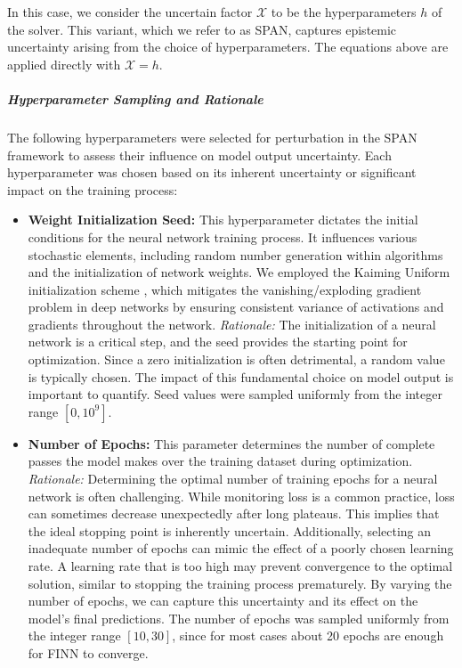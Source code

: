 In this case, we consider the uncertain factor $\mathcal{X}$ to be the hyperparameters $h$ of the solver. This variant, which we refer to as SPAN, captures epistemic uncertainty arising from the choice of hyperparameters. The equations above are applied directly with $\mathcal{X} = h$.

\subparagraph{Hyperparameter Sampling and Rationale}
The following hyperparameters were selected for perturbation in the SPAN framework to assess their influence on model output uncertainty. Each hyperparameter was chosen based on its inherent uncertainty or significant impact on the training process:

\begin{itemize}
    \item \textbf{Weight Initialization Seed:} This hyperparameter dictates the initial conditions for the neural network training process. It influences various stochastic elements, including random number generation within algorithms and the initialization of network weights. We employed the Kaiming Uniform initialization scheme \cite{he2015delving}, which mitigates the vanishing/exploding gradient problem in deep networks by ensuring consistent variance of activations and gradients throughout the network. \textit{Rationale:} The initialization of a neural network is a critical step, and the seed provides the starting point for optimization. Since a zero initialization is often detrimental, a random value is typically chosen. The impact of this fundamental choice on model output is important to quantify. Seed values were sampled uniformly from the integer range $[0, 10^9]$.
    \item \textbf{Number of Epochs:} This parameter determines the number of complete passes the model makes over the training dataset during optimization. \textit{Rationale:} Determining the optimal number of training epochs for a neural network is often challenging. While monitoring loss is a common practice, loss can sometimes decrease unexpectedly after long plateaus. This implies that the ideal stopping point is inherently uncertain. Additionally, selecting an inadequate number of epochs can mimic the effect of a poorly chosen learning rate. A learning rate that is too high may prevent convergence to the optimal solution, similar to stopping the training process prematurely. By varying the number of epochs, we can capture this uncertainty and its effect on the model's final predictions. The number of epochs was sampled uniformly from the integer range $[10, 30]$, since for most cases about 20 epochs are enough for FINN to converge.

\end{itemize}
